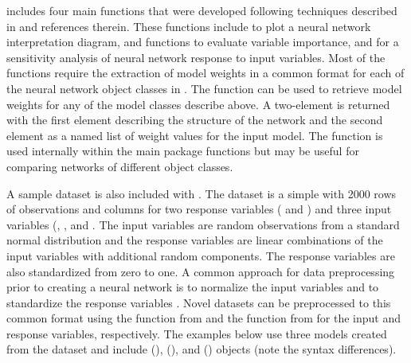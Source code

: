 \documentclass[article,shortnames]{jss}\usepackage[]{graphicx}\usepackage[]{color}
\begin{document}
 includes four main functions that were developed following techniques described in \citet{Olden02} and references therein.  These functions include  to plot a neural network interpretation diagram,  and  functions to evaluate variable importance, and  for a sensitivity analysis of neural network response to input variables.  Most of the functions require the extraction of model weights in a common format for each of the neural network object classes in .  The  function can be used to retrieve model weights for any of the model classes describe above.  A two-element  is returned with the first element describing the structure of the network and the second element as a named list of weight values for the input model.  The function is used internally within the main package functions but may be useful for comparing networks of different object classes.

A sample dataset is also included with .  The  dataset is a simple  with 2000 rows of observations and columns for two response variables ( and ) and three input variables (, , and .  The input variables are random observations from a standard normal distribution and the response variables are linear combinations of the input variables with additional random components.  The response variables are also standardized from zero to one.  A common approach for data preprocessing prior to creating a neural network is to normalize the input variables and to standardize the response variables \citep{Lek00,Olden02}.  Novel datasets can be preprocessed to this common format using the  function from  and the  function from  for the input and response variables, respectively.  The examples below use three models created from the  dataset and include  (),  (), and  () objects (note the syntax differences).
\end{document}
